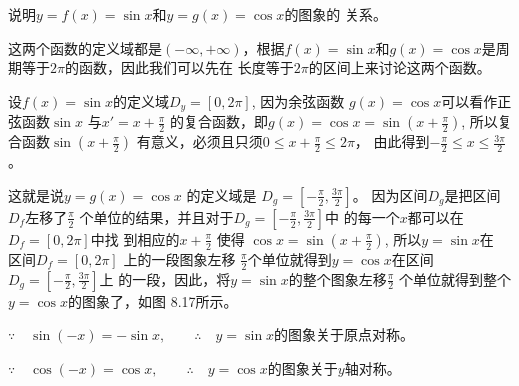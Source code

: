 \begin{example}
    说明$y=f(x)=\sin x$和$y=g(x)=\cos x$的图象的
关系。
\end{example}


\begin{solution}
 这两个函数的定义域都是$(-\infty,+\infty)$，根据$f(x)=
\sin x$和$g(x)=\cos x$是周期等于$2\pi$的函数，因此我们可以先在
长度等于$2\pi$的区间上来讨论这两个函数。

设$f(x)=\sin x$的定义域$D_y=[0,2\pi]$, 因为余弦函数
$g(x)=\cos x$可以看作正弦函数$\sin x$ 与$x'=x+\frac{\pi}{2}$
的复合函数，即$g(x)=\cos x=\sin\left(x+\frac{\pi}{2}\right)$,
所以复合函数$\sin\left(x+\frac{\pi}{2} \right)$
有意义，必须且只须$0\le x+\frac{\pi}{2}\le 2\pi$，
由此得到$-\frac{\pi}{2}\le x\le \frac{3\pi}{2}$。

这就是说$y=g(x)=\cos x$ 的定义域是
$D_g=\left[-\frac{\pi}{2},\frac{3\pi}{2}\right]$。
因为区间$D_g$是把区间$D_f$左移了$\frac{\pi}{2}$
个单位的结果，并且对于$D_g=\left[-\frac{\pi}{2},\frac{3\pi}{2}\right]$中
的每一个$x$都可以在$D_f=[0,2\pi ]$中找
到相应的$x+\frac{\pi}{2}$
使得
$\cos x=\sin\left(x+\frac{\pi}{2}\right)$,
所以$y=\sin x$在
区间$D_f=[0,2\pi]$ 上的一段图象左移
$\frac{\pi}{2}$个单位就得到$y=\cos x$在区间$D_g=
\left[-\frac{\pi}{2},\frac{3\pi}{2}\right]$上
的一段，因此，将$y=\sin x$的整个图象左移$\frac{\pi}{2}$
个单位就得到整个$y=\cos x$的图象了，如图
8.17所示。
\begin{figure}[htp]
    \centering
{}    
    \caption{}
\end{figure}

$\because\quad \sin(-x)=-\sin x,\qquad \therefore\quad y=\sin x$的图象关于原点对称。

$\because\quad \cos(-x)=\cos x,\qquad \therefore\quad y=\cos x$的图象关于$y$轴对称。

\end{solution}


